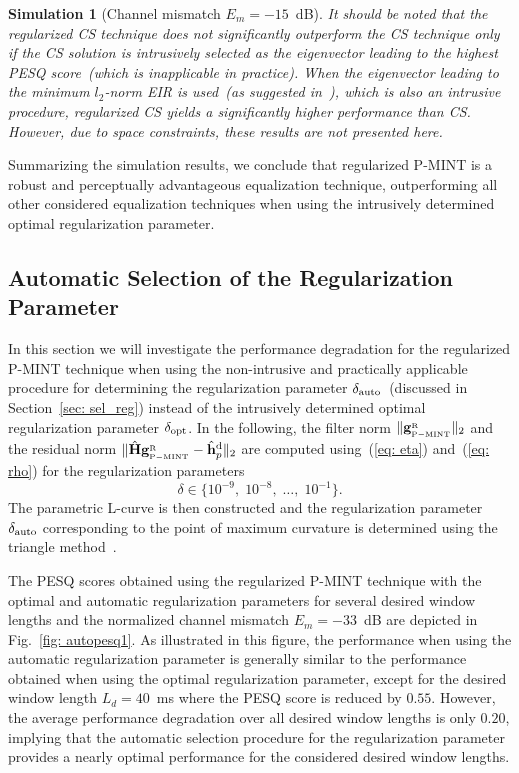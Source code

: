 \documentclass[draftcls,onecolumn,11pt]{IEEEtran}
\newtheorem{simulation}{Simulation}
\begin{document}
\begin{simulation}[Channel mismatch $E_m=-15$~dB]
It should be noted that the regularized CS technique does not significantly outperform the CS technique only if the CS solution is intrusively selected as the eigenvector leading to the highest PESQ score~(which is inapplicable in practice). When the eigenvector leading to the minimum $l_2$-norm EIR is used~(as suggested in~\cite{Zhang_IWAENC_2010}), which is also an intrusive procedure, regularized CS yields a significantly higher performance than CS. However, due to space constraints, these results are not presented here.
\end{simulation}

Summarizing the simulation results, we conclude that regularized P-MINT is a robust and perceptually advantageous equalization technique, outperforming all other considered equalization techniques when using the intrusively determined optimal regularization parameter.

\subsection{Automatic Selection of the Regularization Parameter}
\label{sec: auto}
In this section we will investigate the performance degradation for the regularized P-MINT technique when using the non-intrusive and practically applicable procedure for determining the regularization parameter $\delta_{\rm auto}$~(discussed in Section~\ref{sec: sel_reg}) instead of the intrusively determined optimal regularization parameter $\delta_{\rm opt}$.
In the following, the filter norm $\|\mathbf{g}_{{}_{\rm P-MINT}}^{{_{\rm R}}}\|_2$ and the residual norm $\|\hat{\mathbf{H}}\mathbf{g}_{{}_{\rm P-MINT}}^{{_{\rm R}}} - \hat{\mathbf{h}}_p^{\rm d} \|_2$ are computed using~(\ref{eq: eta}) and~(\ref{eq: rho}) for the regularization parameters
\begin{equation}
\delta \in \{10^{-9}, \; 10^{-8}, \; \ldots, \; 10^{-1} \}.
\end{equation}
The parametric L-curve is then constructed and the regularization parameter $\delta_{\rm auto}$ corresponding to the point of maximum curvature is determined using the triangle method~\cite{Castellanos_2002}.

The PESQ scores obtained using the regularized P-MINT technique with the optimal and automatic regularization parameters for several desired window lengths and the normalized channel mismatch $E_m = -33$~dB are depicted in Fig.~\ref{fig: autopesq1}.
As illustrated in this figure, the performance when using the automatic regularization parameter is generally similar to the performance obtained when using the optimal regularization parameter, except for the desired window length $L_d = 40$~ms where the PESQ score is reduced by $0.55$.
However, the average performance degradation over all desired window lengths is only $0.20$, implying that the automatic selection procedure for the regularization parameter provides a nearly optimal performance for the considered desired window lengths.
\end{document}
